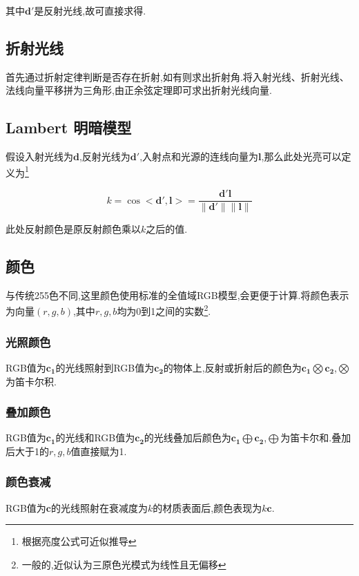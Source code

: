 \documentclass[10pt,twocolumn]{article}
\begin{document}
其中$\mathbf{d'}$是反射光线,故可直接求得.

\subsection{\hei 折射光线}
首先通过折射定律判断是否存在折射,如有则求出折射角.将入射光线、折射光线、法线向量平移拼为三角形,由正余弦定理即可求出折射光线向量.

\subsection{\hei Lambert 明暗模型}
假设入射光线为$\mathbf{d}$,反射光线为$\mathbf{d'}$,入射点和光源的连线向量为$\mathbf{l}$,那么此处光亮可以定义为\footnote{根据亮度公式可近似推导}

\begin{equation}
k=\cos{<\mathbf{d'},\mathbf{l}>}=\frac{\mathbf{d'l}}{\mathbf{\|d'\|\|l\|}}
\end{equation}

此处反射颜色是原反射颜色乘以$k$之后的值.

\subsection{\hei 颜色}
与传统255色不同,这里颜色使用标准的全值域RGB模型,会更便于计算.将颜色表示为向量$(r,g,b)$,其中$r,g,b$均为0到1之间的实数\footnote{一般的,近似认为三原色光模式为线性且无偏移}.

\subsubsection{\hei 光照颜色}
RGB值为$\mathbf{c_1}$的光线照射到RGB值为$\mathbf{c_2}$的物体上,反射或折射后的颜色为$\mathbf{c_1}\bigotimes\mathbf{c_2}$,$\bigotimes $为笛卡尔积.

\subsubsection{\hei 叠加颜色}
RGB值为$\mathbf{c_1}$的光线和RGB值为$\mathbf{c_2}$的光线叠加后颜色为$\mathbf{c_1}\bigoplus\mathbf{c_2}$,$\bigoplus $为笛卡尔和.叠加后大于1的$r,g,b$值直接赋为1.

\subsubsection{\hei 颜色衰减}
RGB值为$\mathbf{c}$的光线照射在衰减度为$k$的材质表面后,颜色表现为$k\mathbf{c}$.
\end{document}
